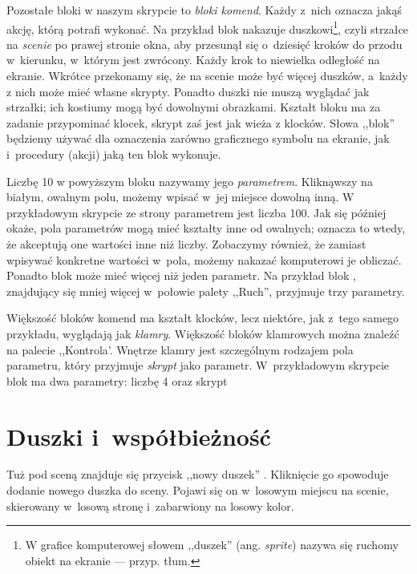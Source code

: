 \documentclass{report}
\begin{document}
Pozostałe bloki w naszym skrypcie to \emph{bloki komend}. Każdy z~nich oznacza jakąś akcję, którą \Snap{} potrafi wykonać. Na przykład blok  nakazuje duszkowi\footnote{W grafice komputerowej słowem ,,duszek'' (ang. \textit{sprite}) nazywa się ruchomy obiekt na ekranie --- przyp. tłum.}, czyli strzałce na \emph{scenie} po prawej stronie okna, aby przesunął się o~dziesięć kroków do przodu w~kierunku, w~którym jest zwrócony. Każdy krok to niewielka odległość na ekranie. Wkrótce przekonamy się, że na scenie może być więcej duszków, a~każdy z nich może mieć własne skrypty. Ponadto duszki nie muszą wyglądać jak strzałki; ich kostiumy mogą być dowolnymi obrazkami. Kształt bloku  ma za zadanie przypominać klocek, skrypt zaś jest jak wieża z klocków. Słowa ,,blok'' będziemy używać dla oznaczenia zarówno graficznego symbolu na ekranie, jak i~procedury (akcji) jaką ten blok wykonuje.

Liczbę 10 w powyższym bloku  nazywamy jego \emph{parametrem}. Kliknąwszy na białym, owalnym polu, możemy wpisać w~jej miejsce dowolną inną. W przykładowym skrypcie ze strony \pageref{fig:typowy-skrypt} parametrem jest liczba 100. Jak się później okaże, pola parametrów mogą mieć kształty inne od owalnych; oznacza to wtedy, że akceptują one wartości inne niż liczby. Zobaczymy również, że zamiast wpisywać konkretne wartości w~pola, możemy nakazać komputerowi je obliczać. Ponadto blok może mieć więcej niż jeden parametr. Na przykład blok , znajdujący się mniej więcej w~połowie palety ,,Ruch'', przyjmuje trzy parametry.

Większość bloków komend ma kształt klocków, lecz niektóre, jak  z~tego samego przykładu, wyglądają jak \emph{klamry}. Większość bloków klamrowych można znaleźć na palecie ,,Kontrola'. Wnętrze klamry jest szczególnym rodzajem pola parametru, który przyjmuje \emph{skrypt} jako parametr. W~przykładowym skrypcie blok  ma dwa parametry: liczbę 4 oraz skrypt


\section{Duszki i~współbieżność}

Tuż pod sceną znajduje się przycisk ,,nowy duszek'' . Kliknięcie go spowoduje dodanie nowego duszka do sceny. Pojawi się on w~losowym miejscu na scenie, skierowany w~losową stronę i~zabarwiony na losowy kolor.
\end{document}
